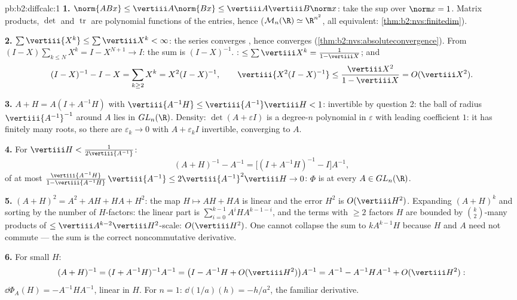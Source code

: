 \begin{solution}{pb:b2:diffcalc:1}
\textbf{1.} $\norm{ABx} \leq \vertiii A\norm{Bx} \leq
\vertiii A\vertiii B\norm x$: take the sup over $\norm x = 1$.
Matrix products, $\det$ and $\operatorname{tr}$ are polynomial
functions of the entries, hence  ($\mathcal M_n(\R)
\simeq \R^{n^2}$, all  equivalent:
\cref{thm:b2:nvs:finitedim}).

\textbf{2.} $\sum\vertiii{X^k} \leq \sum\vertiii X^k <
\infty$: the series converges , hence converges
(\cref{thm:b2:nvs:absoluteconvergence}). From $(I -
X)\sum_{k\leq N}X^k = I - X^{N+1} \to I$: the sum is $(I -
X)^{-1}$. : $\leq \sum\vertiii X^k = \frac{1}{1 -
\vertiii X}$; and
\[
(I - X)^{-1} - I - X = \sum_{k\geq2}X^k = X^2(I - X)^{-1},
\qquad
\vertiii{X^2(I-X)^{-1}} \leq
\frac{\vertiii X^2}{1 - \vertiii X} = O(\vertiii X^2).
\]

\textbf{3.} $A + H = A(I + A^{-1}H)$ with $\vertiii{A^{-1}H}
\leq \vertiii{A^{-1}}\vertiii H < 1$: invertible by question 2:
the  ball of radius $\vertiii{A^{-1}}^{-1}$ around $A$ lies
in $GL_n(\R)$. Density: $\det(A + \varepsilon I)$ is a degree-$n$
polynomial in $\varepsilon$ with leading coefficient $1$: it
has finitely many roots, so there are $\varepsilon_k \to 0$
with $A + \varepsilon_kI$ invertible, converging to $A$.

\textbf{4.} For $\vertiii H < \frac{1}{2\vertiii{A^{-1}}}$:
\[
(A + H)^{-1} - A^{-1}
= \bigl[(I + A^{-1}H)^{-1} - I\bigr]A^{-1},
\]
of  at most $\frac{\vertiii{A^{-1}H}}{1 -
\vertiii{A^{-1}H}}\,\vertiii{A^{-1}} \leq
2\vertiii{A^{-1}}^2\vertiii H \to 0$: $\Phi$ is  at
every $A \in GL_n(\R)$.

\textbf{5.} $(A+H)^2 = A^2 + AH + HA + H^2$: the map $H
\mapsto AH + HA$ is linear and the error $H^2$ is
$O(\vertiii H^2)$. Expanding $(A + H)^k$ and sorting by the
number of $H$-factors: the linear part is
$\sum_{i=0}^{k-1}A^iHA^{k-1-i}$, and the terms with $\geq 2$
factors $H$ are bounded by $\binom k2$-many products of 
$\leq \vertiii A^{k-2}\vertiii H^2$-scale: $O(\vertiii H^2)$.
One cannot collapse the sum to $kA^{k-1}H$ because $H$ and $A$
need not commute --- the sum is the correct noncommutative
derivative.

\textbf{6.} For small $H$:
\[
(A+H)^{-1} = (I + A^{-1}H)^{-1}A^{-1}
= \bigl(I - A^{-1}H + O(\vertiii H^2)\bigr)A^{-1}
= A^{-1} - A^{-1}HA^{-1} + O(\vertiii H^2) :
\]
$\dd\Phi_A(H) = -A^{-1}HA^{-1}$, linear in $H$. For $n = 1$:
$\dd(1/a)(h) = -h/a^2$, the familiar derivative.


\end{solution}

